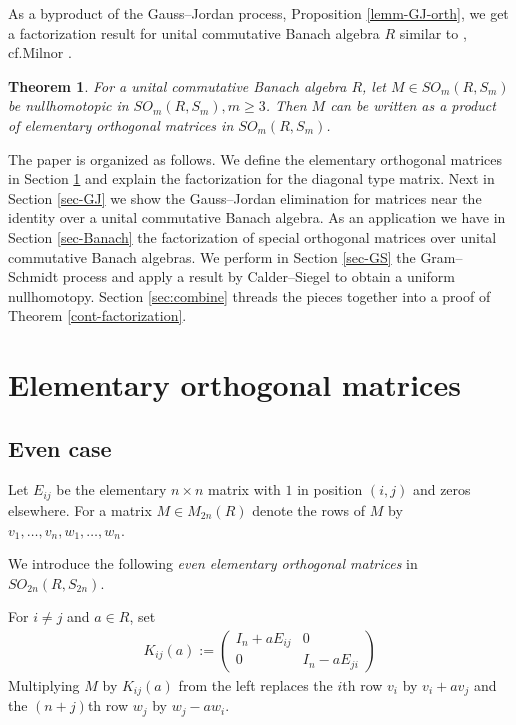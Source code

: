 \documentclass[11pt]{amsart}
\newtheorem{theorem}{Theorem}[section]
\theoremstyle{definition}
\theoremstyle{remark}
\theoremstyle{remark}
\begin{document}

As a byproduct of the Gauss--Jordan process, Proposition \ref{lemm-GJ-orth}, we get a factorization result for unital commutative Banach algebra $R$ similar to \cite[Theorem 1.1]{MR4078081}, cf.\@ Milnor \cite[Lemma 7.1]{MR0349811}. 

\begin{theorem}
For a unital commutative Banach algebra $R$, let $M\in SO_{m}(R,S_m)$ be nullhomotopic
in $SO_{m}(R,S_m), m \ge 3$. Then $M$ can be written as a product of elementary orthogonal matrices in $SO_{m}(R,S_m)$. 
\end{theorem}

The paper is organized as follows. We define the elementary orthogonal matrices in Section \ref{sec-eleMat} and explain the factorization for the diagonal type matrix. Next in Section \ref{sec-GJ} we show the Gauss--Jordan elimination for matrices near the identity over a unital commutative  Banach algebra. As an application we have in Section \ref{sec-Banach} the factorization of special orthogonal matrices over unital commutative Banach algebras. We perform in Section \ref{sec-GS} the Gram--Schmidt process and apply a result by Calder--Siegel to obtain a uniform nullhomotopy. Section \ref{sec:combine} threads the pieces together into a proof of Theorem \ref{cont-factorization}. 


\section{Elementary orthogonal matrices} \label{sec-eleMat}
\subsection{Even case}
Let $E_{ij}$ be the elementary $n\times n$ matrix with $1$ in position $(i,j)$ and zeros elsewhere.
For a matrix $M\in M_{2n}(R)$ denote the rows of $M$ by $v_1,\dots,v_n,w_1,\dots,w_n$. 


We introduce the following \emph{even elementary orthogonal matrices} in $SO_{2n}(R, S_{2n})$.



For $i\neq j$ and $a \in R$, set 
\begin{align*}
    K_{ij}(a):= \begin{pmatrix}
                    I_n+aE_{ij} & 0\\
                    0 & I_n-aE_{ji}
                \end{pmatrix}
\end{align*} 
Multiplying $M$ by $K_{ij}(a)$ from the left replaces the $i$th row $v_i$ by $v_i+a v_j$ and the $(n+j)$th row $w_j$ by $w_j-a w_i$.
\end{document}
